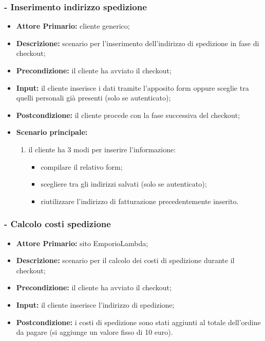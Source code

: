 \subsubsection{ - Inserimento indirizzo spedizione}
\begin{itemize}
    \item \textbf{Attore Primario:} cliente generico;
    \item \textbf{Descrizione:} scenario per l'inserimento dell'indirizzo di spedizione in fase di checkout;
    \item \textbf{Precondizione:} il cliente ha avviato il checkout;
    \item \textbf{Input:} il cliente inserisce i dati tramite l'apposito form oppure sceglie tra quelli personali già presenti (solo se autenticato);
    \item \textbf{Postcondizione:} il cliente procede con la fase successiva del checkout;
    \item \textbf{Scenario principale:}
          \begin{enumerate}
              \item il cliente ha 3 modi per inserire l'informazione:
                    \begin{itemize}
                        \item compilare il relativo form;
                        \item scegliere tra gli indirizzi salvati (solo se autenticato);
                        \item riutilizzare l'indirizzo di fatturazione precedentemente inserito.
                    \end{itemize}
          \end{enumerate}
\end{itemize}

\stepsubUserCase
\subsubsection{ - Calcolo costi spedizione}
\begin{itemize}
    \item \textbf{Attore Primario:} sito EmporioLambda;
    \item \textbf{Descrizione:} scenario per il calcolo dei costi di spedizione durante il checkout;
    \item \textbf{Precondizione:} il cliente ha avviato il checkout;
    \item \textbf{Input:} il cliente inserisce l'indirizzo di spedizione;
    \item \textbf{Postcondizione:} i costi di spedizione sono stati aggiunti al totale dell'ordine da pagare
          (si aggiunge un valore fisso di 10 euro).
\end{itemize}

